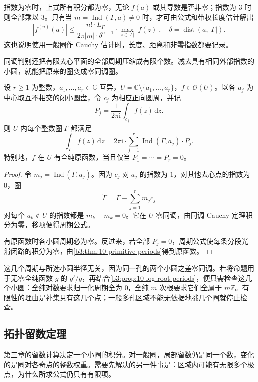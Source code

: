 指数为零时，上式所有积分都为零，无论 \(f(a)\) 或其导数是否非零；指数为 \(3\) 时则全部乘以 \(3\)。只有当 \(m=\operatorname{Ind}(\Gamma,a)\ne0\) 时，才可由公式和带权长度估计解出
\[
 |f^{(n)}(a)|
 \le\frac{n!\cdot L_\Gamma}{2\pi|m|\cdot\delta^{n+1}}
       \cdot\max_{z\in|\Gamma|}|f(z)|,
 \quad \delta=\operatorname{dist}(a,|\Gamma|).
\]
这也说明使用一般圈作 Cauchy 估计时，长度、距离和非零指数都要记录。

\ProseParagraphBreak
同调判别还把有限去心平面的全部周期压缩成有限个数。减去具有相同外部指数的小圆，就能把原来的圈变成零同调圈。

\begin{proposition}[有限去心平面的周期判别]\label{b3:prop:10-finite-puncture-periods}
设 \(r\ge1\) 为整数，\(a_1,\ldots,a_r\in\mathbb C\) 互异，\(U=\mathbb C\setminus\{a_1,\ldots,a_r\}\)，\(f\in\mathcal O(U)\)。以各 \(a_j\) 为中心取互不相交的闭小圆盘，令 \(c_j\) 为相应正向圆周，并记
\[
 P_j=\frac1{2\pi\mathrm i}\int_{c_j}f(z)\,\mathrm dz.
\]
则 \(U\) 内每个整数圈 \(\Gamma\) 都满足
\[
 \int_\Gamma f(z)\,\mathrm dz
 =2\pi\mathrm i\cdot
   \sum_{j=1}^r\operatorname{Ind}(\Gamma,a_j)\cdot P_j.
\]
特别地，\(f\) 在 \(U\) 有全纯原函数，当且仅当 \(P_1=\cdots=P_r=0\)。
\end{proposition}
\begin{proof}
令 \(m_j=\operatorname{Ind}(\Gamma,a_j)\)。因为 \(c_j\) 对 \(a_j\) 的指数为 \(1\)，对其他去心点的指数为 \(0\)，圈
\[
 \widetilde\Gamma=\Gamma-\sum_{j=1}^r m_jc_j
\]
对每个 \(a_k\notin U\) 的指数都是 \(m_k-m_k=0\)。它在 \(U\) 零同调，由同调 Cauchy 定理积分为零，移项便得周期公式。

有原函数时各小圆周期必为零。反过来，若全部 \(P_j=0\)，周期公式使每条分段光滑闭路的积分为零，由\cref{b3:thm:10-primitive-periods}得到原函数。
\end{proof}

这几个周期与所选小圆半径无关，因为同一孔的两个小圆之差零同调。若将命题用于无零全纯函数 \(g\) 的 \(g'/g\)，再结合\cref{b3:prop:10-log-root-periods}，便只需检查这几个小圆：全纯对数要求归一化周期全为 \(0\)，全纯 \(m\) 次根要求它们全属于 \(m\mathbb Z\)。有限性的理由是补集只有这几个点；一般多孔区域不能无依据地挑几个圈就停止检查。

\subsection{拓扑留数定理}
\label{b3:subsec:100304}

第三章的留数计算决定一个小圈的积分。对一般圈，局部留数仍是同一个数，变化的是圈对各奇点的整数权重。需要先解决的另一件事是：区域内可能有无限多个极点，为什么所求公式仍只有有限项。

